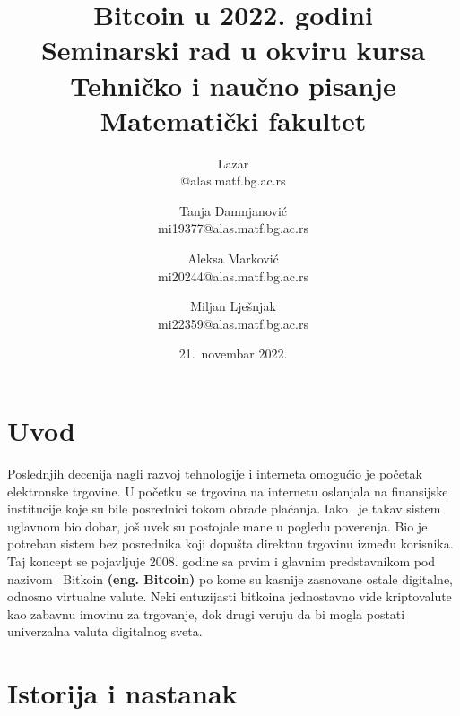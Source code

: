 \documentclass[a4paper]{article}
\begin{document}
\title{Bitcoin u 2022. godini\\ \small{Seminarski rad u okviru kursa\\Tehničko i naučno pisanje\\ Matematički fakultet}}

\author{Lazar\\ @alas.matf.bg.ac.rs\and Tanja Damnjanović\\mi19377@alas.matf.bg.ac.rs\and Aleksa Marković\\mi20244@alas.matf.bg.ac.rs\and Miljan Lješnjak\\mi22359@alas.matf.bg.ac.rs }
\date{21.~novembar 2022.}
\maketitle


\tableofcontents


\newpage

\section{Uvod}
\label{sec:uvod}
Poslednjih decenija nagli razvoj tehnologije i interneta omogućio je početak elektronske trgovine. U početku se trgovina na internetu oslanjala na finansijske institucije koje su bile posrednici tokom obrade plaćanja. Iako  je takav sistem uglavnom bio dobar, još uvek su postojale mane u pogledu poverenja. Bio je potreban sistem bez posrednika koji dopušta direktnu trgovinu između korisnika. Taj koncept se pojavljuje 2008. godine sa prvim i glavnim predstavnikom pod nazivom  Bitkoin \textbf{(eng. Bitcoin)} po kome su kasnije zasnovane ostale digitalne, odnosno virtualne valute. Neki entuzijasti bitkoina jednostavno vide kriptovalute kao zabavnu imovinu za trgovanje, dok drugi veruju da bi mogla postati univerzalna valuta digitalnog sveta.
\\

\section{Istorija i nastanak}
\end{document}

